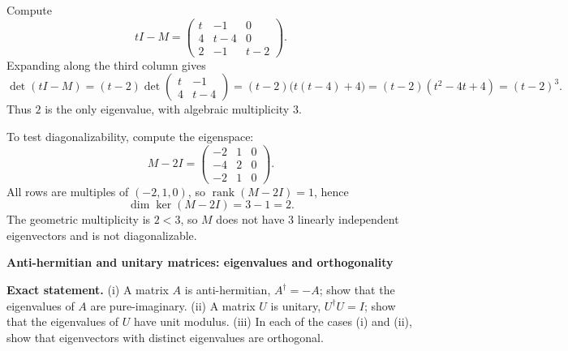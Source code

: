 \begin{solution}
Compute
\[
tI-M=\begin{pmatrix}
	t&-1&0\\
	4&t-4&0\\
	2&-1&t-2
\end{pmatrix}.
\]
Expanding along the third column gives
\[
\det(tI-M)=(t-2)\det\begin{pmatrix}t&-1\\4&t-4\end{pmatrix}
=(t-2)\bigl(t(t-4)+4\bigr)
=(t-2)(t^2-4t+4)=(t-2)^3.
\]
Thus $2$ is the only eigenvalue, with algebraic multiplicity $3$.

To test diagonalizability, compute the eigenspace:
\[
M-2I=\begin{pmatrix}
	-2&1&0\\
	-4&2&0\\
	-2&1&0
\end{pmatrix}.
\]
All rows are multiples of $(-2,1,0)$, so $\operatorname{rank}(M-2I)=1$, hence
\[
\dim\ker(M-2I)=3-1=2.
\]
The geometric multiplicity is $2<3$, so $M$ does not have $3$ linearly independent eigenvectors
and is not diagonalizable.
\end{solution}

\begin{problem}[CP-I-0078]
\label{prob:cp-i-0078}
\textbf{Anti-hermitian and unitary matrices: eigenvalues and orthogonality}

\textbf{Exact statement.}
\hspace*{1.5em}(i) A matrix $A$ is anti-hermitian, $A^\dagger=-A$; show that the eigenvalues of $A$ are pure-imaginary.
(ii) A matrix $U$ is unitary, $U^\dagger U=I$; show that the eigenvalues of $U$ have unit modulus.
(iii) In each of the cases (i) and (ii), show that eigenvectors with distinct eigenvalues are orthogonal.

\end{problem}

